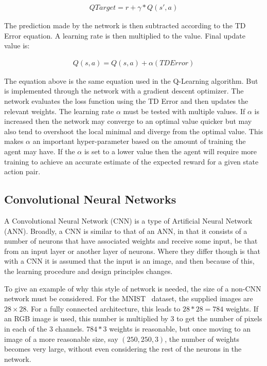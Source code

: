 \begin{align}
    QTarget = r + \gamma*Q(s',a)
\end{align}

The prediction made by the network is then subtracted according to the TD Error
equation. A learning rate is then multiplied to the value. Final update value
is:

\begin{align}
    Q(s,a) = Q(s,a) + \alpha (TDError)
\end{align}

The equation above is the same equation used in the Q-Learning algorithm. But is
implemented through the network with a gradient descent optimizer. The network
evaluates the loss function using the TD Error and then updates the relevant
weights. The learning rate $\alpha$ must be tested with multiple values. If
$\alpha$ is increased then the network may converge to an optimal value quicker
but may also tend to overshoot the local minimal and diverge from the optimal
value. This makes $\alpha$ an important hyper-parameter based on the amount of
training the agent may have. If the $\alpha$ is set to a lower value then the
agent will require more training to achieve an accurate estimate of the expected
reward for a given state action pair.

\subsection{Convolutional Neural Networks}

A Convolutional Neural Network (CNN) is a type of Artificial Neural Network
(ANN). Broadly, a CNN is similar to that of an ANN, in that it consists of a
number of neurons that have associated weights and receive some input, be that
from an input layer or another layer of neurons. Where they differ though is
that with a CNN it is assumed that the input is an image, and then because of
this, the learning procedure and design principles changes.

To give an example of why this style of network is needed, the size of a non-CNN
network must be considered. For the MNIST~\cite{lecun2010mnist} dataset, the
supplied images are $28 \times 28$. For a fully connected architecture, this
leads to $28 * 28 = 784$ weights. If an RGB image is used, this number is
multiplied by 3 to get the number of pixels in each of the 3 channels. $784 * 3$
weights is reasonable, but once moving to an image of a more reasonable size,
say $(250, 250, 3)$, the number of weights becomes very large, without even
considering the rest of the neurons in the network.

